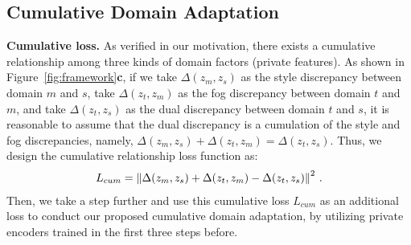 \documentclass[10pt,twocolumn,letterpaper]{article}
\def\imd{m}
\def\td{t}
\newcommand{\heading}[1]{\noindent\textbf{#1}}
\begin{document}
\subsection{Cumulative Domain Adaptation}



\heading{Cumulative loss.}
As verified in our motivation, 
there exists a cumulative relationship among three kinds of domain factors (private features). As shown in Figure~\ref{fig:framework}\textbf{c}, if we take $\Delta(z_{\imd}, z_{s})$ as the style discrepancy between domain $\imd$ and $s$, take $\Delta(z_{\td}, z_{\imd})$ as the fog discrepancy between domain $\td$ and $\imd$, and take $\Delta(z_{\td}, z_{s})$ as the dual discrepancy between domain $\td$ and $s$, it is reasonable to assume that the dual discrepancy is a cumulation of the style and fog discrepancies, namely, 
$\Delta(z_{\imd}, z_{s})+\Delta(z_{\td}, z_{\imd}) = \Delta(z_{\td}, z_{s})$. 
Thus, we design the cumulative relationship loss function as:
\begin{equation}
\label{eq:cumulation}
\begin{split}
{L}_{cum} = \left \| \Delta(z_{\imd}, z_{s}) + \Delta(z_{\td}, z_{\imd}) - \Delta(z_{\td}, z_{s}) \right \| ^2\,.
\end{split}
\vspace{-3mm}
\end{equation}
Then, we take a step further and use this cumulative loss ${L}_{cum}$ as an additional loss to conduct our proposed cumulative domain adaptation, by utilizing private encoders trained in the first three steps before.
\end{document}
